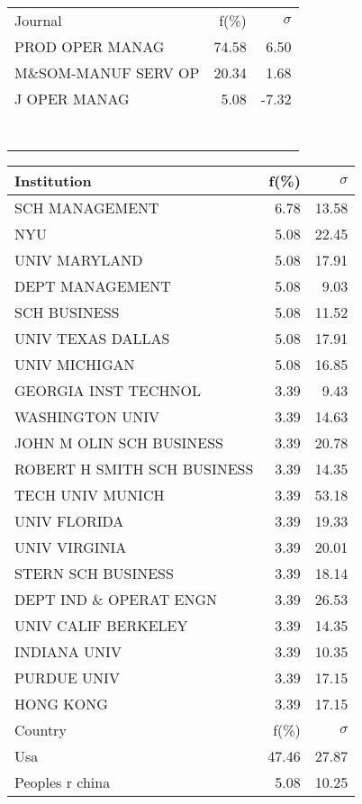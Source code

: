 \documentclass[a4paper,11pt]{report}
\begin{document}
\begin{landscape}
\begin{table}[!ht]
{\begin{tabular}{|l r  r|}
 &  & \\
\hline
\hline
Journal & f(\%) & $\sigma$\\
\hline
PROD OPER MANAG & 74.58 & 6.50\\
M\&SOM-MANUF SERV OP & 20.34 & 1.68\\
J OPER MANAG & 5.08 & -7.32\\
 &  & \\
 &  & \\
 &  & \\
 &  & \\
 &  & \\
 &  & \\
 &  & \\
\hline
\end{tabular}
}
{\scriptsize\begin{tabular}{|l r r|}
\hline
Institution & f(\%) & $\sigma$\\
\hline
SCH MANAGEMENT & 6.78 & 13.58\\
NYU & 5.08 & 22.45\\
UNIV MARYLAND & 5.08 & 17.91\\
DEPT MANAGEMENT & 5.08 & 9.03\\
SCH BUSINESS & 5.08 & 11.52\\
UNIV TEXAS DALLAS & 5.08 & 17.91\\
UNIV MICHIGAN & 5.08 & 16.85\\
GEORGIA INST TECHNOL & 3.39 & 9.43\\
WASHINGTON UNIV & 3.39 & 14.63\\
JOHN M OLIN SCH BUSINESS & 3.39 & 20.78\\
ROBERT H SMITH SCH BUSINESS & 3.39 & 14.35\\
TECH UNIV MUNICH & 3.39 & 53.18\\
UNIV FLORIDA & 3.39 & 19.33\\
UNIV VIRGINIA & 3.39 & 20.01\\
STERN SCH BUSINESS & 3.39 & 18.14\\
DEPT IND \& OPERAT ENGN & 3.39 & 26.53\\
UNIV CALIF BERKELEY & 3.39 & 14.35\\
INDIANA UNIV & 3.39 & 10.35\\
PURDUE UNIV & 3.39 & 17.15\\
HONG KONG & 3.39 & 17.15\\
\hline
\hline
Country & f(\%) & $\sigma$\\
\hline
Usa & 47.46 & 27.87\\
Peoples r china & 5.08 & 10.25\\

\end{tabular}}
\end{table}
\end{landscape}
\end{document}
